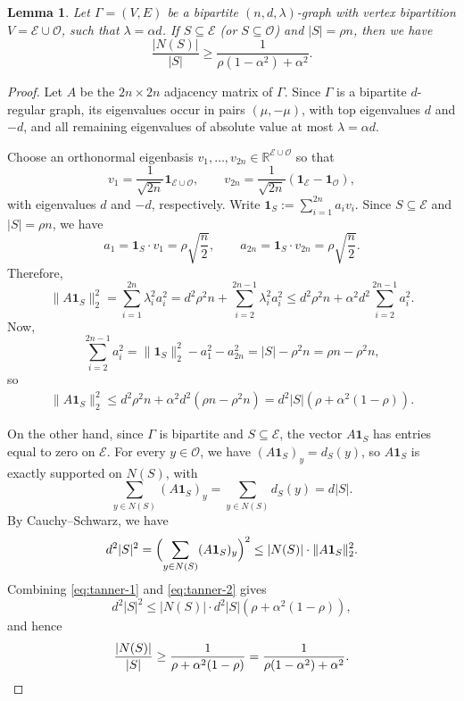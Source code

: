 \documentclass{amsart}
\newtheorem{lem}[thm]{Lemma}
\theoremstyle{definition}
\newcommand{\cO}{\mathcal{O} }
\newcommand{\cE}{\mathcal{E} }
\newcommand{\0}[0]{\emptyset}
\begin{document}
\begin{lem}\label{prop:tanner}
Let $\Gamma=(V,E)$ be a bipartite $(n,d,\lambda)$-graph with vertex bipartition $V=\cE\cup \cO$, such that $\lambda=\alpha d$.
If $S\subseteq \cE$ (or $S\subseteq \cO$) and $|S|=\rho n$, then we have
\[
\frac{|N(S)|}{|S|}
\ge
\frac{1}{\rho(1-\alpha^2)+\alpha^2}.
\]
\end{lem}

\begin{proof}
Let $A$ be the $2n \times 2n$ adjacency matrix of $\Gamma$. Since $\Gamma$ is a bipartite $d$-regular graph, its eigenvalues occur in pairs $(\mu,-\mu)$, with top eigenvalues $d$ and $-d$, and all remaining eigenvalues of absolute value at most $\lambda=\alpha d$.

Choose an orthonormal eigenbasis $v_1,\dots,v_{2n} \in \mathbb R^{\cE\cup \cO}$ so that
\[
v_1=\frac{1}{\sqrt{2n}}\mathbf 1_{\cE\cup \cO},
\qquad
v_{2n}=\frac{1}{\sqrt{2n}}(\mathbf 1_{\cE}-\mathbf 1_{\cO}),
\]
with eigenvalues $d$ and $-d$, respectively. Write $\mathbf 1_S:=\sum_{i=1}^{2n} a_i v_i$. 
Since $S\subseteq \cE$ and $|S|=\rho n$, we have
\[
a_1=\mathbf 1_S\cdot v_1=\rho\sqrt{\frac{n}{2}},
\qquad
a_{2n}=\mathbf 1_S\cdot v_{2n}=\rho\sqrt{\frac{n}{2}}.
\]
Therefore,
\[
\|A\mathbf 1_S\|_2^2
=
\sum_{i=1}^{2n}\lambda_i^2 a_i^2
=
d^2\rho^2 n+\sum_{i=2}^{2n-1}\lambda_i^2 a_i^2
\le
d^2\rho^2 n+\alpha^2 d^2\sum_{i=2}^{2n-1} a_i^2.
\]
Now,
\[
\sum_{i=2}^{2n-1}a_i^2
=
\|\mathbf 1_S\|_2^2-a_1^2-a_{2n}^2
=
|S|-\rho^2 n
=
\rho n-\rho^2 n,
\]
so
\begin{align}\label{eq:tanner-1}
    \|A\mathbf 1_S\|_2^2
\le
d^2\rho^2 n+\alpha^2 d^2(\rho n-\rho^2 n)
=
d^2 |S|(\rho+\alpha^2(1-\rho)).
\end{align}

On the other hand, since $\Gamma$ is bipartite and $S\subseteq \cE$, the vector $A\mathbf 1_S$ has entries equal to zero on $\cE$. For every $y\in \cO$, we have $(A\mathbf 1_S)_y=d_S(y)$,
so $A\mathbf 1_S$ is exactly supported on $N(S)$, with
\[
\sum_{y\in N(S)} (A\mathbf 1_S)_y=\sum_{y\in N(S)}d_S(y)=d|S|.
\]
By Cauchy--Schwarz, we have
\begin{align}\label{eq:tanner-2}
    d^2|S|^2
=
\Bigl(\sum_{y\in N(S)} (A\mathbf 1_S)_y\Bigr)^2
\le
|N(S)|\cdot \|A\mathbf 1_S\|_2^2.
\end{align}
Combining \eqref{eq:tanner-1} and \eqref{eq:tanner-2} gives
\[
d^2|S|^2
\le
|N(S)|\cdot d^2|S|(\rho+\alpha^2(1-\rho)),
\]
and hence
\[
\frac{|N(S)|}{|S|}
\ge
\frac{1}{\rho+\alpha^2(1-\rho)}
=
\frac{1}{\rho(1-\alpha^2)+\alpha^2}.
\qedhere
\]
\end{proof}
\end{document}

